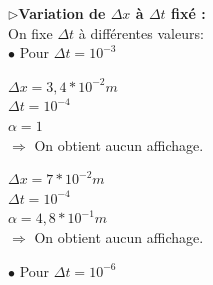 $\triangleright$\textbf{Variation de  $\Delta x$ à $\Delta t$ fixé :}\\

On fixe $\Delta t$ à différentes valeurs:\\

\hspace*{1cm}$\bullet$ Pour $\Delta t= {10}^{-3}$ \\

\begin{enumerate}[label=\alph*)]

\begin{minipage}{.6\textwidth}%

\item $\Delta x=3,4*{10}^{-2}m$ \\
$\Delta t= {10}^{-4}$ \\
$\alpha= 1$\\


$\Longrightarrow$ On obtient aucun affichage.

\end{minipage}%
\hfill
\begin{minipage}{.6\textwidth}%

\item $\Delta x=7*{10}^{-2}m$ \\
$\Delta t= {10}^{-4}$ \\
$\alpha= 4,8*{10}^{-1}m$\\


$\Longrightarrow$ On obtient aucun affichage.\\

\end{minipage}%


\end{enumerate}

\vspace*{1cm}
\hspace*{1cm}$\bullet$ Pour $\Delta t= {10}^{-6}$ \\

